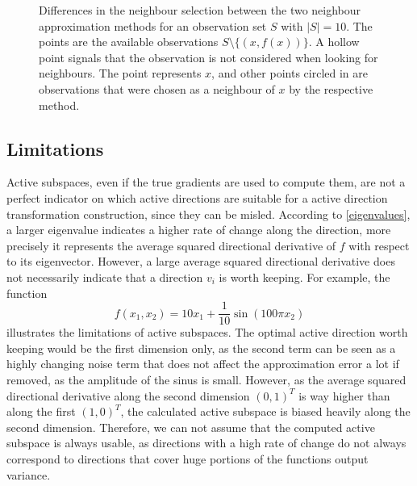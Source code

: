 \documentclass[
  a4paper,  %
  twoside,  %
  bibliography=totoc,
  headsepline,
  cleardoublepage=empty,
  parskip=half,
  draft=false
]{scrbook}
\begin{document}
\begin{mdframed}[style=style]
\begin{figure}[H]
\begin{subfigure}{.45\textwidth}
  \vspace{2mm}
  \label{fig:as_nn}
\end{subfigure}
\delimit
\caption{Differences in the neighbour selection between the two neighbour approximation methods for an observation set $S$ with $|S|=10$.
The \darkblue points are the available observations $S \setminus \{(x, f(x))\}$.
A hollow point signals that the observation is not considered when looking for neighbours.
The \red point represents $x$, and other points circled in \red are observations that were chosen as a neighbour of $x$ by the respective method.}
\label{fig:as_approx}
\end{figure}
\end{mdframed}

\subsection{Limitations}
\label{sec:asl}

Active subspaces, even if the true gradients are used to compute them, are not a perfect indicator on which active directions are suitable for a active direction transformation construction, since they can be misled.
According to \cref{eigenvalues}, a larger eigenvalue indicates a higher rate of change along the direction, more precisely it represents the average squared directional derivative of $f$ with respect to its eigenvector.
However, a large average squared directional derivative does not necessarily indicate that a direction $v_i$ is worth keeping.
For example, the function
\begin{equation}
f(x_1, x_2)=10x_1 + \frac{1}{10} \sin(100 \pi x_2)
\end{equation}
illustrates the limitations of active subspaces.
The optimal active direction worth keeping would be the first dimension only, as the second term can be seen as a highly changing noise term that does not affect the approximation error a lot if removed, as the amplitude of the sinus is small.
However, as the average squared directional derivative along the second dimension $(0,1)^T$ is way higher than along the first $(1,0)^T$, the calculated active subspace is biased heavily along the second dimension.
Therefore, we can not assume that the computed active subspace is always usable, as directions with a high rate of change do not always correspond to directions that cover huge portions of the functions output variance.
\end{document}
